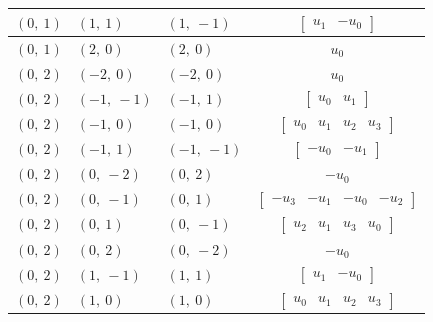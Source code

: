\documentclass[11pt]{article}
\theoremstyle{definition}
\begin{document}
\begin{longtable}{|l|l|l|c|}
    \hline
    $\left( 0, \  1\right)$ & $\left( 1, \  1\right)$ & $\left( 1, \  -1\right)$ & $\left[\begin{matrix}u_{1} & - u_{0}\end{matrix}\right]$ \\
    \hline
    $\left( 0, \  1\right)$ & $\left( 2, \  0\right)$ & $\left( 2, \  0\right)$ & $u_{0}$ \\
    \hline
    $\left( 0, \  2\right)$ & $\left( -2, \  0\right)$ & $\left( -2, \  0\right)$ & $u_{0}$ \\
    \hline
    $\left( 0, \  2\right)$ & $\left( -1, \  -1\right)$ & $\left( -1, \  1\right)$ & $\left[\begin{matrix}u_{0} & u_{1}\end{matrix}\right]$ \\
    \hline
    $\left( 0, \  2\right)$ & $\left( -1, \  0\right)$ & $\left( -1, \  0\right)$ & $\left[\begin{matrix}u_{0} & u_{1} & u_{2} & u_{3}\end{matrix}\right]$ \\
    \hline
    $\left( 0, \  2\right)$ & $\left( -1, \  1\right)$ & $\left( -1, \  -1\right)$ & $\left[\begin{matrix}- u_{0} & - u_{1}\end{matrix}\right]$ \\
    \hline
    $\left( 0, \  2\right)$ & $\left( 0, \  -2\right)$ & $\left( 0, \  2\right)$ & $- u_{0}$ \\
    \hline
    $\left( 0, \  2\right)$ & $\left( 0, \  -1\right)$ & $\left( 0, \  1\right)$ & $\left[\begin{matrix}- u_{3} & - u_{1} & - u_{0} & - u_{2}\end{matrix}\right]$ \\
    \hline
    $\left( 0, \  2\right)$ & $\left( 0, \  1\right)$ & $\left( 0, \  -1\right)$ & $\left[\begin{matrix}u_{2} & u_{1} & u_{3} & u_{0}\end{matrix}\right]$ \\
    \hline
    $\left( 0, \  2\right)$ & $\left( 0, \  2\right)$ & $\left( 0, \  -2\right)$ & $- u_{0}$ \\
    \hline
    $\left( 0, \  2\right)$ & $\left( 1, \  -1\right)$ & $\left( 1, \  1\right)$ & $\left[\begin{matrix}u_{1} & - u_{0}\end{matrix}\right]$ \\
    \hline
    $\left( 0, \  2\right)$ & $\left( 1, \  0\right)$ & $\left( 1, \  0\right)$ & $\left[\begin{matrix}u_{0} & u_{1} & u_{2} & u_{3}\end{matrix}\right]$ \\

\end{longtable}
\end{document}
